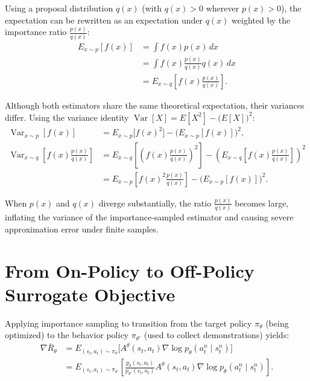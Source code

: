 \documentclass[11pt, a4paper]{article}
\begin{document}
Using a proposal distribution $q(x)$ (with $q(x) > 0$ wherever $p(x) > 0$), the expectation can be rewritten as an expectation under $q(x)$ weighted by the importance ratio $\frac{p(x)}{q(x)}$:
\begin{align}
    E_{x \sim p}[f(x)] &= \int f(x) p(x)\, dx \nonumber \\
    &= \int f(x) \frac{p(x)}{q(x)} q(x)\, dx \nonumber \\
    &= E_{x \sim q}\left[f(x) \frac{p(x)}{q(x)}\right].\label{eq:ppo-importance-sampling}
\end{align}

Although both estimators share the same theoretical expectation, their variances differ. Using the variance identity $\operatorname{Var}[X] = E[X^2] - \big(E[X]\big)^2$:
\begin{align}
    \operatorname{Var}_{x \sim p}[f(x)] &= E_{x \sim p}\big[f(x)^2\big] - \big(E_{x \sim p}[f(x)]\big)^2,\label{eq:ppo-sampling-variance} \\
    \operatorname{Var}_{x \sim q}\left[f(x) \frac{p(x)}{q(x)}\right] &= E_{x \sim q}\left[\left(f(x) \frac{p(x)}{q(x)}\right)^2\right] - \left(E_{x \sim q}\left[f(x) \frac{p(x)}{q(x)}\right]\right)^2 \nonumber \\
    &= E_{x \sim p}\left[f(x)^2 \frac{p(x)}{q(x)}\right] - \big(E_{x \sim p}[f(x)]\big)^2.\label{eq:ppo-importance-sampling-variance}
\end{align}

When $p(x)$ and $q(x)$ diverge substantially, the ratio $\frac{p(x)}{q(x)}$ becomes large, inflating the variance of the importance-sampled estimator and causing severe approximation error under finite samples.

\section{From On-Policy to Off-Policy Surrogate Objective}

Applying importance sampling to transition from the target policy $\pi_\theta$ (being optimized) to the behavior policy $\pi_{\theta'}$ (used to collect demonstrations) yields:
\begin{align}
    \nabla \bar{R}_\theta &= E_{(s_t, a_t) \sim \pi_\theta}\big[A^\theta(s_t, a_t) \nabla \log p_\theta(a_t^n \mid s_t^n)\big] \nonumber \\
    &= E_{(s_t, a_t) \sim \pi_{\theta'}}\left[\frac{p_\theta(s_t, a_t)}{p_{\theta'}(s_t, a_t)} A^\theta(s_t, a_t) \nabla \log p_\theta(a_t^n \mid s_t^n)\right].\label{eq:ppo-joint-importance-gradient}
\end{align}
\end{document}

